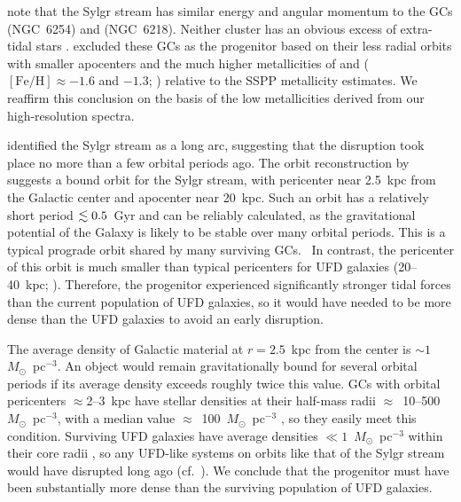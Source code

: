 \documentclass[twocolumn,tighten]{aastex62}
\newcommand{\feh}{{\mathrm{[Fe/H]}}}
\newcommand{\msun}{\mbox{$M_{\odot}$}}
\begin{document}
 note that the Sylgr stream has similar 
energy and angular momentum to the GCs
 (NGC~6254) and 
 (NGC~6218). 
Neither cluster has an obvious excess of 
extra-tidal stars \citep{deboer_etal19,kundu19}.
 excluded these GCs
as the progenitor based on their 
less radial orbits with smaller apocenters 
\citep[$< 5$~kpc;][]{baumgardt_etal19}
and
the much higher metallicities of
 and
($\feh \approx -1.6$ and $-1.3$; \citealt{carretta09feh})
relative to the SSPP metallicity estimates.
We reaffirm this conclusion on the basis of
the low metallicities 
derived from our high-resolution spectra.

 identified the Sylgr stream as a long arc,
suggesting that the disruption 
took place no more than a few orbital periods ago.
The orbit reconstruction by  
suggests a bound orbit for the Sylgr stream, 
with pericenter near 2.5~kpc from the Galactic center 
and apocenter near 20~kpc.
Such an orbit has a relatively short period 
$\lesssim 0.5$~Gyr and can be reliably calculated, 
as the gravitational potential of the Galaxy 
is likely to be stable over many orbital periods.
This is a typical prograde orbit shared by many surviving GCs.~ 
In contrast, the pericenter of this orbit 
is much smaller than typical pericenters for UFD galaxies 
(20--40~kpc; \citealt{fritz18, simon18}). 
Therefore, the progenitor experienced significantly stronger tidal forces 
than the current population of 
UFD galaxies, 
so it would have needed to be more dense than the UFD galaxies
to avoid an early disruption.

The average density of Galactic material at $r=2.5$~kpc 
from the center is $\sim 1$~\msun~pc$^{-3}$. 
An object would remain gravitationally bound for several orbital periods 
if its average density exceeds roughly twice this value. 
GCs with orbital pericenters $\approx$2--3~kpc \citep{helmi18}
have stellar densities at their half-mass radii
$\approx$~10--500~\msun~pc$^{-3}$, 
with a median value $\approx$~100~\msun~pc$^{-3}$
\citep{baumgardt_hilker18},
so they easily meet this condition.
Surviving UFD galaxies have average densities
$\ll 1$~\msun~pc$^{-3}$ within their core radii \citep{simon07},
so any UFD-like systems on orbits like that of the Sylgr stream
would have disrupted long ago
(cf.\ \citealt{roederer18d}).
We conclude that the progenitor must have been substantially 
more dense than the surviving population of UFD galaxies.
\end{document}
